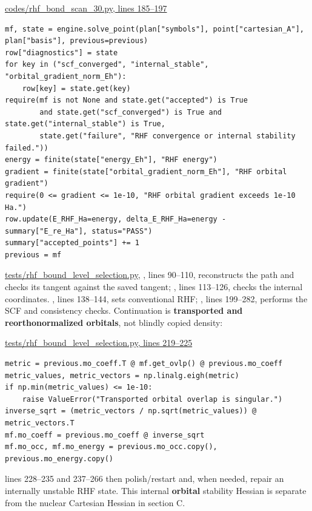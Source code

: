 \documentclass[10pt,a4paper]{article}
\begin{document}
\href{/Users/novaz/Desktop/qml2.0/codes/rhf\_bond\_scan\_30.py:185}{codes/rhf\_bond\_scan\_30.py, lines 185–197}

\begin{Verbatim}
mf, state = engine.solve_point(plan["symbols"], point["cartesian_A"], plan["basis"], previous=previous)
row["diagnostics"] = state
for key in ("scf_converged", "internal_stable", "orbital_gradient_norm_Eh"):
    row[key] = state.get(key)
require(mf is not None and state.get("accepted") is True
        and state.get("scf_converged") is True and state.get("internal_stable") is True,
        state.get("failure", "RHF convergence or internal stability failed."))
energy = finite(state["energy_Eh"], "RHF energy")
gradient = finite(state["orbital_gradient_norm_Eh"], "RHF orbital gradient")
require(0 <= gradient <= 1e-10, "RHF orbital gradient exceeds 1e-10 Ha.")
row.update(E_RHF_Ha=energy, delta_E_RHF_Ha=energy - summary["E_re_Ha"], status="PASS")
summary["accepted_points"] += 1
previous = mf
\end{Verbatim}
\href{/Users/novaz/Desktop/qml2.0/tests/rhf\_bound\_level\_selection.py:90}{tests/rhf\_bound\_level\_selection.py}, , lines 90–110, reconstructs the path and checks its tangent against the saved tangent; , lines 113–126, checks the internal coordinates. , lines 138–144, sets conventional RHF; , lines 199–282, performs the SCF and consistency checks. Continuation is \textbf{transported and reorthonormalized orbitals}, not blindly copied density:

\href{/Users/novaz/Desktop/qml2.0/tests/rhf\_bound\_level\_selection.py:219}{tests/rhf\_bound\_level\_selection.py, lines 219–225}

\begin{Verbatim}
metric = previous.mo_coeff.T @ mf.get_ovlp() @ previous.mo_coeff
metric_values, metric_vectors = np.linalg.eigh(metric)
if np.min(metric_values) <= 1e-10:
    raise ValueError("Transported orbital overlap is singular.")
inverse_sqrt = (metric_vectors / np.sqrt(metric_values)) @ metric_vectors.T
mf.mo_coeff = previous.mo_coeff @ inverse_sqrt
mf.mo_occ, mf.mo_energy = previous.mo_occ.copy(), previous.mo_energy.copy()
\end{Verbatim}
 lines 228–235 and 237–266 then polish/restart and, when needed, repair an internally unstable RHF state. This internal \textbf{orbital} stability Hessian is separate from the nuclear Cartesian Hessian in section C.
\end{document}

